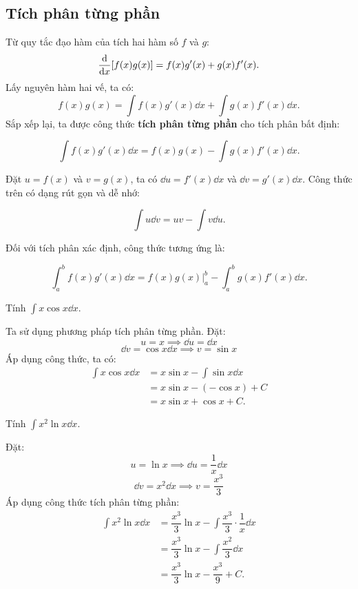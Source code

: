 \subsection{Tích phân từng phần}
Từ quy tắc đạo hàm của tích hai hàm số $f$ và $g$:
\[
    \frac{\mathrm{d}}{\mathrm{d}x}[f(x)g(x)] = f(x)g'(x) + g(x)f'(x).
\]
Lấy nguyên hàm hai vế, ta có:
\[
    f(x)g(x) = \int f(x)g'(x) \dd x + \int g(x)f'(x) \dd x.
\]
Sắp xếp lại, ta được công thức \textbf{tích phân từng phần} cho tích phân bất định:
\begin{importantbox}
    \[ \int f(x)g'(x) \dd x = f(x)g(x) - \int g(x)f'(x) \dd x. \]
\end{importantbox}
Đặt $u = f(x)$ và $v = g(x)$, ta có $\dd u = f'(x)\dd x$ và $\dd v = g'(x)\dd x$. Công thức trên có dạng rút gọn và dễ nhớ:
\begin{importantbox}
    \[ \int u \dd v = uv - \int v \dd u. \]
\end{importantbox}
Đối với tích phân xác định, công thức tương ứng là:
\begin{importantbox}
    \[ \int_a^b f(x)g'(x) \dd x = f(x)g(x)\bigg|_a^b - \int_a^b g(x)f'(x) \dd x. \]
\end{importantbox}

\begin{example}
    Tính $\int x \cos x \dd x$.
\end{example}
\begin{solution}
    Ta sử dụng phương pháp tích phân từng phần. Đặt:
    \[
        u = x \implies \dd u = \dd x
    \]
    \[
        \dd v = \cos x \dd x \implies v = \sin x
    \]
    Áp dụng công thức, ta có:
    \begin{align*}
        \int x \cos x \dd x &= x \sin x - \int \sin x \dd x \\
        &= x \sin x - (-\cos x) + C \\
        &= x \sin x + \cos x + C.
    \end{align*}
\end{solution}

\begin{example}
    Tính $\int x^2 \ln x \dd x$.
\end{example}
\begin{solution}
    Đặt:
    \[
        u = \ln x \implies \dd u = \dfrac{1}{x} \dd x
    \]
    \[
        \dd v = x^2 \dd x \implies v = \dfrac{x^3}{3}
    \]
    Áp dụng công thức tích phân từng phần:
    \begin{align*}
        \int x^2 \ln x \dd x &= \dfrac{x^3}{3} \ln x - \int \dfrac{x^3}{3} \cdot \dfrac{1}{x} \dd x \\
        &= \dfrac{x^3}{3} \ln x - \int \dfrac{x^2}{3} \dd x \\
        &= \dfrac{x^3}{3} \ln x - \dfrac{x^3}{9} + C.
    \end{align*}
\end{solution}

